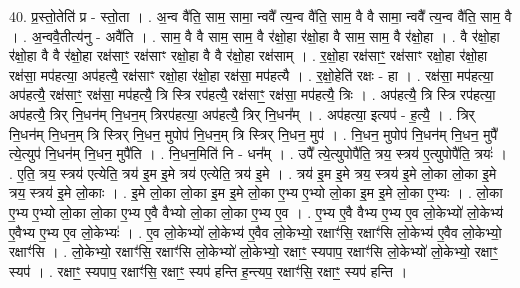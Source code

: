 \documentclass[17pt]{extarticle}
\begin{document}
40. प्र॒स्तो॒तेति॑ प्र - स्तो॒ता । . अ॒न्व वै॑ति॒ साम॒ सामा॒ न्ववै᳚ त्य॒न्व वै॑ति॒ साम॒ वै वै सामा॒ न्ववै᳚ त्य॒न्व वै॑ति॒ साम॒ वै । . अ॒न्ववै॒तीत्य॑नु - अवै॑ति । . साम॒ वै वै साम॒ साम॒ वै र॑क्षो॒हा र॑क्षो॒हा वै साम॒ साम॒ वै र॑क्षो॒हा । . वै र॑क्षो॒हा र॑क्षो॒हा वै वै र॑क्षो॒हा रक्ष॑साꣳ॒॒ रक्ष॑साꣳ रक्षो॒हा वै वै र॑क्षो॒हा रक्ष॑साम् । . र॒क्षो॒हा रक्ष॑साꣳ॒॒ रक्ष॑साꣳ रक्षो॒हा र॑क्षो॒हा रक्ष॑सा॒ मप॑हत्या॒ अप॑हत्यै॒ रक्ष॑साꣳ रक्षो॒हा र॑क्षो॒हा रक्ष॑सा॒ मप॑हत्यै । . र॒क्षो॒हेति॑ रक्षः - हा । . रक्ष॑सा॒ मप॑हत्या॒ अप॑हत्यै॒ रक्ष॑साꣳ॒॒ रक्ष॑सा॒ मप॑हत्यै॒ त्रि स्त्रि रप॑हत्यै॒ रक्ष॑साꣳ॒॒ रक्ष॑सा॒ मप॑हत्यै॒ त्रिः । . अप॑हत्यै॒ त्रि स्त्रि रप॑हत्या॒ अप॑हत्यै॒ त्रिर् नि॒धन॑म् नि॒धन॒म् त्रिरप॑हत्या॒ अप॑हत्यै॒ त्रिर् नि॒धन᳚म् । . अप॑हत्या॒ इत्यप॑ - ह॒त्यै॒ । . त्रिर् नि॒धन॑म् नि॒धन॒म् त्रि स्त्रिर् नि॒धन॒ मुपोप॑ नि॒धन॒म् त्रि स्त्रिर् नि॒धन॒ मुप॑ । . नि॒धन॒ मुपोप॑ नि॒धन॑म् नि॒धन॒ मुपै᳚ त्ये॒त्युप॑ नि॒धन॑म् नि॒धन॒ मुपै॑ति । . नि॒धन॒मिति॑ नि - धन᳚म् । . उपै᳚ त्ये॒त्युपोपै॑ति॒ त्रय॒ स्त्रय॑ ए॒त्युपोपै॑ति॒ त्रयः॑ । . ए॒ति॒ त्रय॒ स्त्रय॑ एत्येति॒ त्रय॑ इ॒म इ॒मे त्रय॑ एत्येति॒ त्रय॑ इ॒मे । . त्रय॑ इ॒म इ॒मे त्रय॒ स्त्रय॑ इ॒मे लो॒का लो॒का इ॒मे त्रय॒ स्त्रय॑ इ॒मे लो॒काः । . इ॒मे लो॒का लो॒का इ॒म इ॒मे लो॒का ए॒भ्य ए॒भ्यो लो॒का इ॒म इ॒मे लो॒का ए॒भ्यः । . लो॒का ए॒भ्य ए॒भ्यो लो॒का लो॒का ए॒भ्य ए॒वै वैभ्यो लो॒का लो॒का ए॒भ्य ए॒व । . ए॒भ्य ए॒वै वैभ्य ए॒भ्य ए॒व लो॒केभ्यो॑ लो॒केभ्य॑ ए॒वैभ्य ए॒भ्य ए॒व लो॒केभ्यः॑ । . ए॒व लो॒केभ्यो॑ लो॒केभ्य॑ ए॒वैव लो॒केभ्यो॒ रक्षाꣳ॑सि॒ रक्षाꣳ॑सि लो॒केभ्य॑ ए॒वैव लो॒केभ्यो॒ रक्षाꣳ॑सि । . लो॒केभ्यो॒ रक्षाꣳ॑सि॒ रक्षाꣳ॑सि लो॒केभ्यो॑ लो॒केभ्यो॒ रक्षाꣳ॒॒ स्यपाप॒ रक्षाꣳ॑सि लो॒केभ्यो॑ लो॒केभ्यो॒ रक्षाꣳ॒॒ स्यप॑ । . रक्षाꣳ॒॒ स्यपाप॒ रक्षाꣳ॑सि॒ रक्षाꣳ॒॒ स्यप॑ हन्ति ह॒न्त्यप॒ रक्षाꣳ॑सि॒ रक्षाꣳ॒॒ स्यप॑ हन्ति । \newline
\pagebreak
{}
\end{document}

